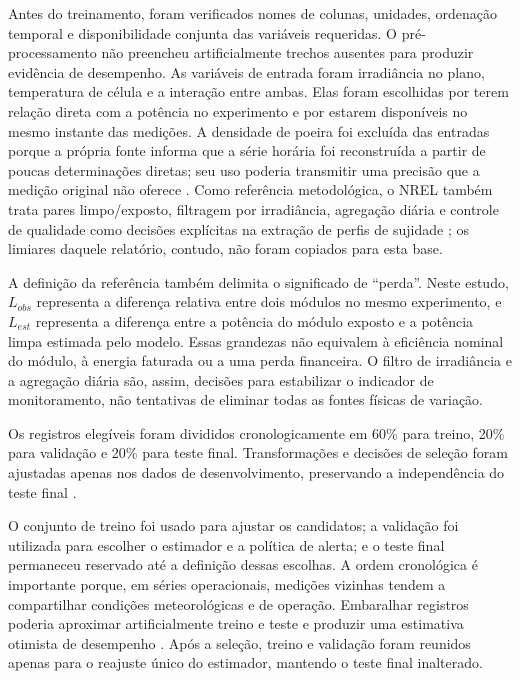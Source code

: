\documentclass{UNESC}
\begin{document}
Antes do treinamento, foram verificados nomes de colunas, unidades, ordenação temporal e disponibilidade conjunta das variáveis requeridas. O pré-processamento não preencheu artificialmente trechos ausentes para produzir evidência de desempenho. As variáveis de entrada foram irradiância no plano, temperatura de célula e a interação entre ambas. Elas foram escolhidas por terem relação direta com a potência no experimento e por estarem disponíveis no mesmo instante das medições. A densidade de poeira foi excluída das entradas porque a própria fonte informa que a série horária foi reconstruída a partir de poucas determinações diretas; seu uso poderia transmitir uma precisão que a medição original não oferece \cite{seghir2026}. Como referência metodológica, o NREL também trata pares limpo/exposto, filtragem por irradiância, agregação diária e controle de qualidade como decisões explícitas na extração de perfis de sujidade \cite{micheli2017nrel}; os limiares daquele relatório, contudo, não foram copiados para esta base.

A definição da referência também delimita o significado de ``perda''. Neste estudo, $L_{obs}$ representa a diferença relativa entre dois módulos no mesmo experimento, e $L_{est}$ representa a diferença entre a potência do módulo exposto e a potência limpa estimada pelo modelo. Essas grandezas não equivalem à eficiência nominal do módulo, à energia faturada ou a uma perda financeira. O filtro de irradiância e a agregação diária são, assim, decisões para estabilizar o indicador de monitoramento, não tentativas de eliminar todas as fontes físicas de variação.

Os registros elegíveis foram divididos cronologicamente em 60\% para treino, 20\% para validação e 20\% para teste final. Transformações e decisões de seleção foram ajustadas apenas nos dados de desenvolvimento, preservando a independência do teste final \cite{kapoor2023}.

O conjunto de treino foi usado para ajustar os candidatos; a validação foi utilizada para escolher o estimador e a política de alerta; e o teste final permaneceu reservado até a definição dessas escolhas. A ordem cronológica é importante porque, em séries operacionais, medições vizinhas tendem a compartilhar condições meteorológicas e de operação. Embaralhar registros poderia aproximar artificialmente treino e teste e produzir uma estimativa otimista de desempenho \cite{cerqueira2020}. Após a seleção, treino e validação foram reunidos apenas para o reajuste único do estimador, mantendo o teste final inalterado.
\end{document}

